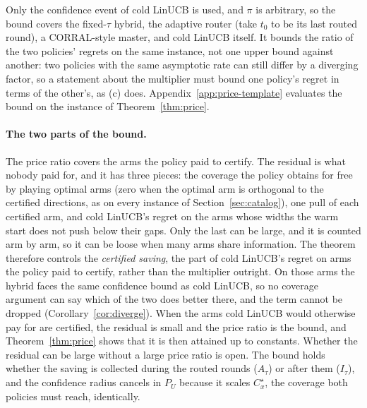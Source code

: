 \documentclass{article}
\theoremstyle{definition}
\theoremstyle{remark}
\theoremstyle{remark}
\begin{document}
Only the confidence event of cold LinUCB is used, and
$\pi$ is arbitrary, so the bound covers the fixed-$\tau$ hybrid, the adaptive
router (take $t_0$ to be its last routed round), a CORRAL-style master, and
cold LinUCB itself. It bounds the ratio of the two policies' regrets on the
same instance, not one upper bound against another: two policies with the
same asymptotic rate can still differ by a diverging factor, so a statement
about the multiplier must bound one policy's regret in terms of the other's,
as (c) does. Appendix~\ref{app:price-template} evaluates the bound on the
instance of Theorem~\ref{thm:price}.

\paragraph{The two parts of the bound.}
The price ratio covers the arms the policy paid to certify. The
residual is what nobody paid for, and it has three pieces: the coverage the policy obtains for free by playing optimal arms
(zero when the optimal arm is orthogonal to the certified directions, as on
every instance of Section~\ref{sec:catalog}), one pull of each certified arm,
and cold LinUCB's regret on the arms whose widths the warm start does not push
below their gaps. Only the last can be large, and it is counted arm by arm,
so it can be loose when many arms share information. The theorem therefore
controls the \emph{certified saving}, the part of cold LinUCB's regret on arms
the policy paid to certify, rather than the multiplier outright. On those arms the hybrid faces
the same confidence bound as cold LinUCB, so no coverage argument can say
which of the two does better there, and the term cannot be dropped
(Corollary~\ref{cor:diverge}). When the arms cold LinUCB would
otherwise pay for are certified, the residual is small and the price ratio is
the bound, and Theorem~\ref{thm:price} shows that it is then attained up to
constants.
Whether the residual can be large without a large price ratio is open. The
bound holds whether the saving is collected during the routed rounds
($A_\tau$) or after them ($I_\tau$), and the confidence radius cancels in
$P_U$ because it scales $C^\star_x$, the coverage both policies must reach,
identically.
\end{document}
